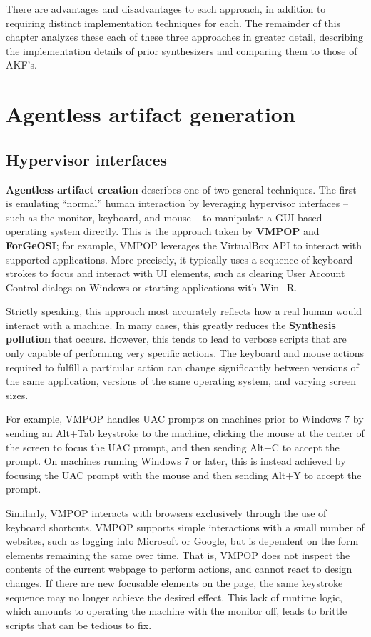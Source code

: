 There are advantages and disadvantages to each approach, in addition to
requiring distinct implementation techniques for each. The remainder of
this chapter analyzes these each of these three approaches in greater
detail, describing the implementation details of prior synthesizers and
comparing them to those of AKF's.

\section{Agentless artifact
generation}\label{agentless-artifact-generation}

\subsection{Hypervisor interfaces}\label{hypervisor-interfaces}

\textbf{Agentless artifact creation} describes one of two general
techniques. The first is emulating ``normal'' human interaction by
leveraging hypervisor interfaces -- such as the monitor, keyboard, and
mouse -- to manipulate a GUI-based operating system directly. This is
the approach taken by \textbf{VMPOP} and \textbf{ForGeOSI}; for example,
VMPOP leverages the VirtualBox API to interact with supported
applications. More precisely, it typically uses a sequence of keyboard
strokes to focus and interact with UI elements, such as clearing User
Account Control dialogs on Windows or starting applications with Win+R.

Strictly speaking, this approach most accurately reflects how a real
human would interact with a machine. In many cases, this greatly reduces
the \textbf{Synthesis pollution} that occurs. However, this tends to
lead to verbose scripts that are only capable of performing very
specific actions. The keyboard and mouse actions required to fulfill a
particular action can change significantly between versions of the same
application, versions of the same operating system, and varying screen
sizes.

For example, VMPOP handles UAC prompts on machines prior to Windows 7 by
sending an Alt+Tab keystroke to the machine, clicking the mouse at the
center of the screen to focus the UAC prompt, and then sending Alt+C to
accept the prompt. On machines running Windows 7 or later, this is
instead achieved by focusing the UAC prompt with the mouse and then
sending Alt+Y to accept the prompt.

Similarly, VMPOP interacts with browsers exclusively through the use of
keyboard shortcuts. VMPOP supports simple interactions with a small
number of websites, such as logging into Microsoft or Google, but is
dependent on the form elements remaining the same over time. That is,
VMPOP does not inspect the contents of the current webpage to perform
actions, and cannot react to design changes. If there are new focusable
elements on the page, the same keystroke sequence may no longer achieve
the desired effect. This lack of runtime logic, which amounts to
operating the machine with the monitor off, leads to brittle scripts
that can be tedious to fix.

